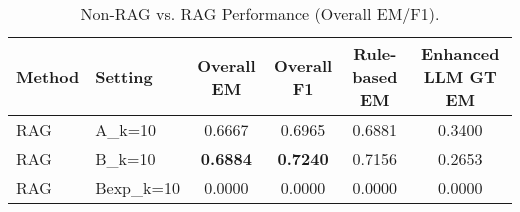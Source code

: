 \begin{table}[t]
\centering
\caption{Non-RAG vs. RAG Performance (Overall EM/F1).}
\label{tab:rag_nonrag_results}
\begin{tabular}{llcccc}
\hline
Method & Setting & Overall EM & Overall F1 & Rule-based EM & Enhanced LLM GT EM \\ 
\hline
RAG & A_k=10 & 0.6667 & 0.6965 & 0.6881 & 0.3400 \\
RAG & B_k=10 & \textbf{0.6884} & \textbf{0.7240} & 0.7156 & 0.2653 \\
RAG & Bexp_k=10 & 0.0000 & 0.0000 & 0.0000 & 0.0000 \\
\hline
\end{tabular}
\end{table}